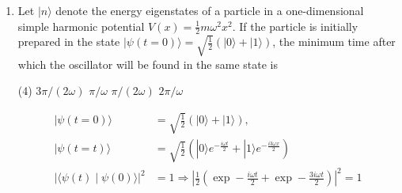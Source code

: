 \begin{enumerate}
{	}
\begin{tasks}(4)
\task[\textbf{A.}] $b_{2}=0, b_{1}=1$
\task[\textbf{B.}] $b_{2}=\frac{1}{\sqrt{2}} b_{1}$
\task[\textbf{C.}] $b_{2}=\frac{1}{2} b_{1}$
\task[\textbf{D.}] $b_{2}=b_{1}$
\end{tasks}
\begin{answer}
\begin{align*}
\langle x\rangle&=b_{1}^{2}\langle 0|x| 0\rangle+b_{2}^{2}\langle 1|x| 1\rangle+2 b_{1} b_{2}\langle 0|x| 1\rangle\\
\text{	Since }\langle 0|x| 0\rangle&=0\text{ and }\langle 1|x| 1\rangle\\&=0 \Rightarrow\langle x\rangle=2 b_{1} b_{2}\langle 0|x| 1\rangle\\
\intertext{Min of $\langle x\rangle$ means $\min 2 b_{1} b_{2}$. We know that $b_{1}^{2}+b_{2}^{2}=1$}
\langle x \rangle_{min}&=\left[ \left( b_1+b_2\right)^2 -\left( b_1^2+b_2^2\right) \right] \bra{0}x\ket{1}\\&=\left[ \left( b_1+b_2\right)^2-1 \right] \bra{0}x\ket{1}\Rightarrow\left[1-\left( b_1-b_2\right)^2  \right] \bra{0}x
\ket{1}
\intertext{will be minimum and minimum value of $\left[1-\left(b_{1}-b_{2}\right)^{2}\right]$, there must be maximum of $\left(b_{1}-b_{2}\right)^{2}$, so $\Rightarrow b_{1}=b_{2}$}
\end{align*}
So the correct answer is \textbf{Option (D)}
\end{answer}
	\item Let $|n\rangle$ denote the energy eigenstates of a particle in a one-dimensional simple harmonic potential $V(x)=\frac{1}{2} m \omega^{2} x^{2}$. If the particle is initially prepared in the state $|\psi(t=0)\rangle=\sqrt{\frac{1}{2}}(|0\rangle+|1\rangle)$, the minimum time after which the oscillator will be found in the same state is
{	}
\begin{tasks}(4)
\task[\textbf{A.}] $3 \pi /(2 \omega)$
\task[\textbf{B.}] $\pi / \omega$
\task[\textbf{C.}] $\pi /(2 \omega)$
\task[\textbf{D.}] $2 \pi / \omega$
\end{tasks}
\begin{answer}
\begin{align*}
|\psi(t=0)\rangle&=\sqrt{\frac{1}{2}}(|0\rangle+|1\rangle), \\|\psi(t=t)\rangle&=\sqrt{\frac{1}{2}}\left(|0\rangle e^{-\frac{i \omega t}{2}}+|1\rangle e^{-\frac{i 3 \omega x}{2}}\right)\\
|\langle\psi(t) \mid \psi(0)\rangle|^{2}&=1 \Rightarrow\left|\frac{1}{2}\left(\exp -\frac{i \omega t}{2}+\exp -\frac{3 i \omega t}{2}\right)\right|^{2}=1\\

\end{align*}
\end{answer}
\end{enumerate}

